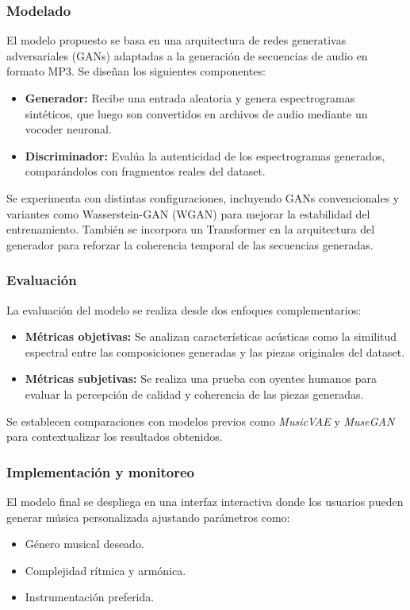 \subsubsection{Modelado}

El modelo propuesto se basa en una arquitectura de redes generativas adversariales (GANs) adaptadas a la generación de secuencias de audio en formato MP3. Se diseñan los siguientes componentes:
\begin{itemize}
    \item \textbf{Generador:} Recibe una entrada aleatoria y genera espectrogramas sintéticos, que luego son convertidos en archivos de audio mediante un vocoder neuronal.
    \item \textbf{Discriminador:} Evalúa la autenticidad de los espectrogramas generados, comparándolos con fragmentos reales del dataset.
\end{itemize}

Se experimenta con distintas configuraciones, incluyendo GANs convencionales y variantes como Wasserstein-GAN (WGAN) para mejorar la estabilidad del entrenamiento. También se incorpora un Transformer en la arquitectura del generador para reforzar la coherencia temporal de las secuencias generadas.

\subsubsection{Evaluación}

La evaluación del modelo se realiza desde dos enfoques complementarios:
\begin{itemize}
    \item \textbf{Métricas objetivas:} Se analizan características acústicas como la similitud espectral entre las composiciones generadas y las piezas originales del dataset.
    \item \textbf{Métricas subjetivas:} Se realiza una prueba con oyentes humanos para evaluar la percepción de calidad y coherencia de las piezas generadas.
\end{itemize}

Se establecen comparaciones con modelos previos como \textit{MusicVAE} y \textit{MuseGAN} para contextualizar los resultados obtenidos.

\subsubsection{Implementación y monitoreo}

El modelo final se despliega en una interfaz interactiva donde los usuarios pueden generar música personalizada ajustando parámetros como:
\begin{itemize}
    \item Género musical deseado.
    \item Complejidad rítmica y armónica.
    \item Instrumentación preferida.
\end{itemize}


